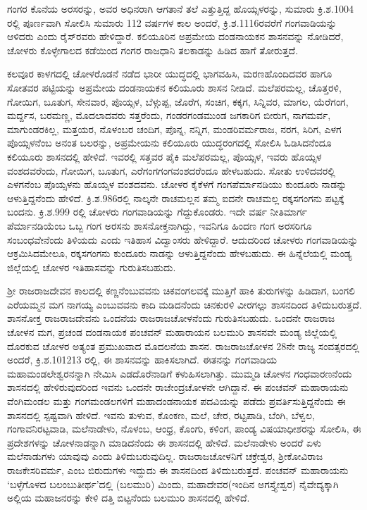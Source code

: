 ಗಂಗರ ಕೊನೆಯ ಅರಸರನ್ನು, ಅವರ ಅಧಿನರಾಗಿ ಆಗತಾನೆ ತಲೆ ಎತ್ತುತ್ತಿದ್ದ ಹೊಯ್ಸಳರನ್ನು, ಸುಮಾರು ಕ್ರಿ.ಶ.1004 ರಲ್ಲಿ ಪೂರ್ಣವಾಗಿ ಸೋಲಿಸಿ ಸುಮಾರು 112 ವರ್ಷಗಳ ಕಾಲ ಅಂದರೆ, ಕ್ರಿ.ಶ.1116ರವರೆಗೆ ಗಂಗವಾಡಿಯನ್ನು ಆಳಿದರು ಎಂದು ರೈಸ್​ರವರು ಹೇಳಿದ್ದಾರೆ. ಕಲಿಯೂರಿನ ಅಪ್ರಮೇಯ ದಂಡನಾಯಕನ ಶಾಸನವನ್ನು ನೋಡಿದರೆ, ಚೋಳರು ಕೊಳ್ಳೇಗಾಲದ ಕಡೆಯಿಂದ ಗಂಗರ ರಾಜಧಾನಿ ತಲಕಾಡನ್ನು ಹಿಡಿದ ಹಾಗೆ ತೋರುತ್ತದೆ.

ಕಲವೂರ ಕಾಳಗದಲ್ಲಿ ಚೋಳರೊಡನೆ ನಡೆದ ಭಾರೀ ಯುದ್ಧದಲ್ಲಿ ಭಾಗವಹಿಸಿ, ಮರಣಹೊಂದಿದವರ ಹಾಗೂ ಸೋತವರ ಪಟ್ಟಿಯನ್ನು ಅಪ್ರಮೇಯ ದಂಡನಾಯಕನ ಕಲಿಯೂರು ಶಾಸನ ನೀಡಿದೆ. ಮಲೆಪರಮಲ್ಲ, ಚೊತ್ತರಳಿ, ಗೋಯಿಗ, ಬೂತುಗ, ಸೇನವಾರ, ಪೊಯ್ಸಳ, ಬೆಳ್ಗುಪ್ಪ, ಜೊರೆಗ, ಸಂಚಿಗ, ಕಕ್ಕಗ, ಸಿನ್ನಿವರ, ಮಾಗಲ, ಯೆರೆಗಂಗ, ಮರ್ದ್ದಸ, ಬರಮಣ್ಣ, ಮೊದಲಾದವರು ಸತ್ತರೆಂದು, ಗಂಡರಗಂಡಮುಂಡ ಜಗಕಾರಿಗ ಬೀರುಗ, ನಾಗಮರ್ವ, ಮಾಗುಂಡರಕಿಲ್ಲ, ಮತ್ತಯರ, ನೊಳಂಬರ ಚಂದಿಗ, ಪೊನ್ನ, ನನ್ನಿಗ, ಮಂಡರಿವರ್ಮರಾಜ, ನರಗ, ಸಿರಿಗ, ಎಳಗ ಪೊಯ್ಸಳನೆಂಬ ಅನಂತ ಬಲರನ್ನು, ಅಪ್ರಮೇಯನು ಕಲಿಯೂರು ಯುದ್ಧರಂಗದಲ್ಲಿ ಸೋಲಿಸಿ ಓಡಿಸಿದನೆಂದೂ ಕಲಿಯೂರು ಶಾಸನದಲ್ಲಿ ಹೇಳಿದೆ. ಇವರಲ್ಲಿ ಸತ್ತವರ ಪೈಕಿ ಮಲೆಪರಮಲ್ಲ, ಪೊಯ್ಸಳ, ಇವರು ಹೊಯ್ಸಳ ವಂಶದವರೆಂದು, ಗೋಯಿಗ, ಬೂತುಗ, ಎರೆಗಂಗ\break ಗಂಗವಂಶದರೆಂದೂ ಹೇಳಬಹುದು. ಸೋತು ಉಳಿದವರಲ್ಲಿ ಎಳಗನೆಂಬ ಪೊಯ್ಸಳನು ಹೊಯ್ಸಳ ವಂಶದವನು. ಚೋಳರ ಕೈಕೆಳಗೆ ಗಂಗಪೆರ್ಮಾನಡಿಯು ಕುಂದೂರು ನಾಡನ್ನು ಆಳುತ್ತಿದ್ದನೆಂದು ಹೇಳಿದೆ. ಕ್ರಿ.ಶ.986ರಲ್ಲಿ ನಾಲ್ಕನೇ ರಾಚಮಲ್ಲನ ತಮ್ಮ ಐದನೇ ರಾಚಮಲ್ಲ ರಕ್ಕಸಗಂಗನು ಪಟ್ಟಕ್ಕೆ ಬಂದನು. ಕ್ರಿ.ಶ.999 ರಲ್ಲಿ ಚೋಳರು ಗಂಗವಾಡಿಯನ್ನು ಗೆದ್ದುಕೊಂಡರು. ಇದೇ ವರ್ಷ ನೀತಿಮಾರ್ಗ ಪೆರ್ಮಾನಡಿಯೆಂಬ ಒಬ್ಬ ಗಂಗ ಅರಸನು ಶಾಸನೋಕ್ತನಾಗಿದ್ದು, ಇವನಿಗೂ ಹಿಂದಣ ಗಂಗ ಅರಸರಿಗೂ ಸಂಬಂಧವೇನೆಂದು ತಿಳಿಯದು ಎಂದು ಇತಿಹಾಸ ವಿದ್ವಾಂಸರು ಹೇಳಿದ್ದಾರೆ. ಆದುದರಿಂದ ಚೋಳರು ಗಂಗವಾಡಿಯನ್ನು ಆಕ್ರಮಿಸಿದಮೇಲೂ, ರಕ್ಕಸಗಂಗನು ಕುಂದೂರು ನಾಡನ್ನು ಆಳುತ್ತಿದ್ದನೆಂದು ಹೇಳಬಹುದು. ಈ ಹಿನ್ನೆಲೆಯಲ್ಲಿ ಮಂಡ್ಯ ಜಿಲ್ಲೆಯಲ್ಲಿ ಚೋಳರ ಇತಿಹಾಸವನ್ನು ಗುರುತಿಸಬಹುದು.

ಶ‍್ರೀ ರಾಜರಾಜದೇವನ ಕಾಲದಲ್ಲಿ ಕಣ್ಣನೆಂಬುವವನು ಚಿಕವಂಗಲವಕ್ಕೆ ಮುತ್ತಿಗೆ ಹಾಕಿ ತುರುಗಳನ್ನು ಹಿಡಿದಾಗ, ಬಂಗಲಿ ಎರೆಯಮ್ಮನ ಮಗ ನಾಗಯ್ಯ ಎಂಬುವವನು ಕಾದಿ ಮಡಿದನೆಂದು ಚಿನಕುರಳಿ ವೀರಗಲ್ಲು ಶಾಸನದಿಂದ ತಿಳಿದು\-ಬರುತ್ತದೆ. ಶಾಸನೋಕ್ತ ರಾಜರಾಜದೇವನು ಒಂದನೆಯ ರಾಜರಾಜಚೋಳನೆಂದು ಗುರುತಿಸಬಹುದು. ಒಂದನೇ ರಾಜರಾಜ ಚೋಳನ ಮಗ, ಪ್ರಚಂಡ ದಂಡನಾಯಕ ಪಂಚವನ್​ ಮಹಾರಾಯನ ಬಲಮುರಿ ಶಾಸನವೇ ಮಂಡ್ಯ ಜಿಲ್ಲೆಯಲ್ಲಿ ದೊರಕುವ ಚೋಳರ ಅತ್ಯಂತ ಪ್ರಮುಖವಾದ ಮೊದಲನೆಯ ಶಾಸನ. ರಾಜರಾಜಚೋಳನ 28ನೇ ರಾಜ್ಯ ಸಂವತ್ಸರದಲ್ಲಿ ಅಂದರೆ, ಕ್ರಿ.ಶ.1012\enginline{-}13 ರಲ್ಲಿ, ಈ ಶಾಸನವನ್ನು ಹಾಕಿಸಲಾಗಿದೆ. ಈತನನ್ನು ಗಂಗವಾಡಿಯ ಮಹಾಮಂಡಲೇಶ್ವರನನ್ನಾಗಿ ನೇಮಿಸಿ ಎಡದೊರೆನಾಡಿಗೆ ಕಳುಹಿಸಲಾಗಿತ್ತು. ಮುಮ್ಮಡಿ ಚೋಳನ ಗಂಧವಾರಣನೆಂದು ಶಾಸನದಲ್ಲಿ ಹೇಳಿರುವುದರಿಂದ ಇವನು ಒಂದನೇ ರಾಜೇಂದ್ರಚೋಳನೇ ಆಗಿದ್ದಾನೆ. ಈ ಪಂಚವನ್​ ಮಹಾರಾಯನು ವೆಂಗಿಮಂಡಲ ಮತ್ತು ಗಂಗಮಂಡಲಗಳಿಗೆ ಮಹಾದಂಡನಾಯಕ ಪದವಿಯನ್ನು ಪಡೆದು ಪ್ರವರ್ತಿಸುತ್ತಿದ್ದನೆಂದು ಈ ಶಾಸನದಲ್ಲಿ ಸ್ಪಷ್ಟವಾಗಿ ಹೇಳಿದೆ. ಇವನು ತುಳುವ, ಕೊಂಕಣ, ಮಲೆ, ಚೇರ, ರಟ್ಟಪಾಡಿ, ಬೆಂಗಿ, ಬೆಳ್ವಲ, ಗಂಗಾವನಿರಟ್ಟವಾಡಿ, ಮಲೆನಾಡೇಳು, ನೊಳಂಬ, ಆಂಧ್ರ, ಕೊಂಗು, ಕಳಿಂಗ, ಪಾಂಡ್ಯ ವಿಷಯಾಧೀಶರನ್ನು ಸೋಲಿಸಿ, ಈ ಪ್ರದೇಶಗಳನ್ನು ಚೋಳನಾಡನ್ನಾಗಿ ಮಾಡಿದನೆಂದು ಈ ಶಾಸನದಲ್ಲಿ ಹೇಳಿದೆ. ಮಲೆನಾಡೇಳು ಅಂದರೆ ಏಳು ಮಲೆನಾಡುಗಳು ಯಾವುವು ಎಂದು ತಿಳಿದುಬರುವುದಿಲ್ಲ. ರಾಜರಾಜಚೋಳನಿಗೆ ಚಕ್ರೇಶ್ವರ, ಶ‍್ರೀಕೋವಿರಾಜ ರಾಜಕೇಸರಿವರ್ಮ, ಎಂಬ ಬಿರುದುಗಳು ಇದ್ದುದು ಈ ಶಾಸನದಿಂದ ತಿಳಿದುಬರುತ್ತದೆ. ಪಂಚವನ್​ ಮಹಾರಾಯನು ‘ಬಳ್ಳೆಗೊಳದ ಬಲಂಬುತೀರ್ಥ’ದಲ್ಲಿ (ಬಲಮುರಿ) ಮಿಂದು, ಮಹಾದೇವರ(ಇಂದಿನ ಅಗಸ್ತ್ಯೇಶ್ವರ) ನೈವೇದ್ಯ\-ಕ್ಕಾಗಿ ಅಲ್ಲಿಯ ಮಹಾಜನರನ್ನು ಕೇಳಿ ದತ್ತಿ ಬಿಟ್ಟನೆಂದು ಬಲಮುರಿ ಶಾಸನದಲ್ಲಿ ಹೇಳಿದೆ.

